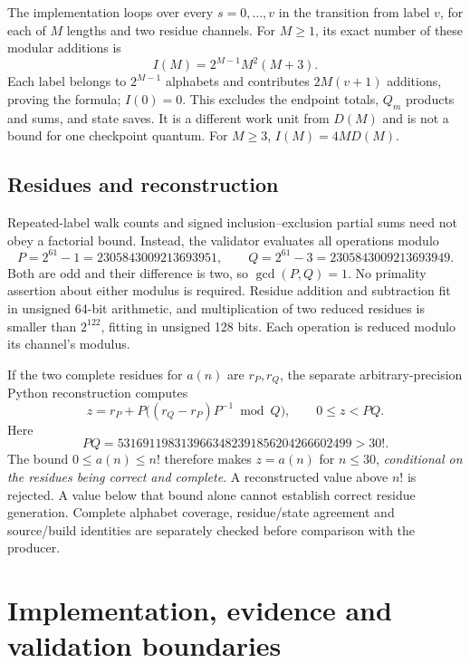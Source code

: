 \documentclass[11pt]{article}
\theoremstyle{definition}
\theoremstyle{remark}
\begin{document}
The implementation loops over every $s=0,\ldots,v$ in the transition
from label $v$, for each of $M$ lengths and two residue channels.
For $M\geq1$, its exact number of these modular additions is
\begin{equation}
 I(M)=2^{M-1}M^2(M+3).
 \label{eq:I}
\end{equation}
Each label belongs to $2^{M-1}$ alphabets and contributes $2M(v+1)$
additions, proving the formula; $I(0)=0$.
This excludes the endpoint totals, $Q_m$ products and sums, and state saves.
It is a different work unit from $D(M)$ and is not a bound for one
checkpoint quantum. For $M\geq3$, $I(M)=4M D(M)$.

\subsection{Residues and reconstruction}

Repeated-label walk counts and signed inclusion--exclusion partial sums
need not obey a factorial bound. Instead, the validator evaluates all
operations modulo
\begin{equation}
 P=2^{61}-1=2305843009213693951,\qquad
 Q=2^{61}-3=2305843009213693949.
 \label{eq:moduli}
\end{equation}
Both are odd and their difference is two, so $\gcd(P,Q)=1$.
No primality assertion about either modulus is required. Residue addition
and subtraction fit in unsigned 64-bit arithmetic, and multiplication of
two reduced residues is smaller than $2^{122}$, fitting in unsigned 128 bits.
Each operation is reduced modulo its channel's modulus.

If the two complete residues for $a(n)$ are $r_P,r_Q$, the separate
arbitrary-precision Python reconstruction computes
\begin{equation}
 z=r_P+P\bigl((r_Q-r_P)P^{-1}\bmod Q\bigr),\qquad 0\leq z<PQ.
 \label{eq:crt}
\end{equation}
Here
\[
 PQ=5316911983139663482391856204266602499>30!.
\]
The bound $0\leq a(n)\leq n!$ therefore makes $z=a(n)$ for $n\leq30$,
\emph{conditional on the residues being correct and complete}.
A reconstructed value above $n!$ is rejected. A value below that bound
alone cannot establish correct residue generation. Complete alphabet
coverage, residue/state agreement and source/build identities are separately
checked before comparison with the producer.

\section{Implementation, evidence and validation boundaries}
\label{sec:validation}
\end{document}
